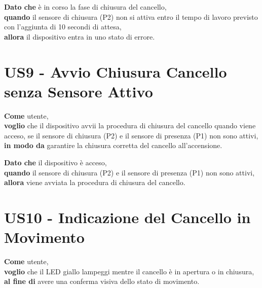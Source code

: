 \begin{tcolorbox}[title={Criterio di Accettazione}, colback=blue!20!white, colframe=blue!80!black]
    \textbf{Dato che} è in corso la fase di chiusura del cancello, \\
    \textbf{quando} il sensore di chiusura (P2) non si attiva entro il tempo di lavoro previsto con l'aggiunta di 10 secondi di attesa, \\
    \textbf{allora} il dispositivo entra in uno stato di errore.
\end{tcolorbox}

\section{US9 - Avvio Chiusura Cancello senza Sensore Attivo}
\begin{tcolorbox}[title={Descrizione}, colback=red!20!white, colframe=red!80!black]
    \textbf{Come} utente, \\
    \textbf{voglio} che il dispositivo avvii la procedura di chiusura del cancello quando viene acceso, se il sensore di chiusura (P2) e il sensore di presenza (P1) non sono attivi, \\
    \textbf{in modo da} garantire la chiusura corretta del cancello all'accensione.
\end{tcolorbox}

\begin{tcolorbox}[title={Criterio di Accettazione}, colback=blue!20!white, colframe=blue!80!black]
    \textbf{Dato che} il dispositivo è acceso, \\
    \textbf{quando} il sensore di chiusura (P2) e il sensore di presenza (P1) non sono attivi, \\
    \textbf{allora} viene avviata la procedura di chiusura del cancello.
\end{tcolorbox}

\section{US10 - Indicazione del Cancello in Movimento}
\begin{tcolorbox}[title={Descrizione}, colback=red!20!white, colframe=red!80!black]
    \textbf{Come} utente, \\
    \textbf{voglio} che il LED giallo lampeggi mentre il cancello è in apertura o in chiusura, \\
    \textbf{al fine di} avere una conferma visiva dello stato di movimento.
\end{tcolorbox}

